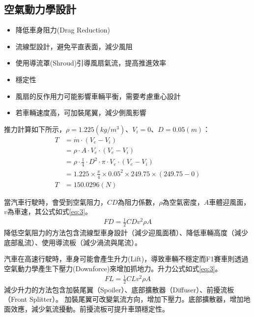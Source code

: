 \documentclass[12pt]{article}       %
\begin{document}
\subsection{空氣動力學設計} 
\begin{itemize}
    \item 降低車身阻力(Drag Reduction)
    \item 流線型設計，避免平直表面，減少風阻
    \item 使用導流罩(Shroud)引導風扇氣流，提高推進效率
    \item 穩定性
    \item 風扇的反作用力可能影響車輛平衡，需要考慮重心設計
    \item 若車輛速度高，可加裝尾翼，減少側風影響
\end{itemize}

推力計算如下所示，$\rho = 1.225(kg/m^3)$、$V_i =0$、$D=0.05(m)$：
\begin{align}
    T &= \dot{m} \cdot (V_e - V_i) \label{eq:thrust_formula} 
    \\
    &= \rho \cdot A \cdot V_e \cdot (V_e - V_i)   \nonumber
    \\
    &= \rho \cdot \frac{1}{4} \cdot D^2\cdot \pi \cdot V_e \cdot (V_e - V_i)   \nonumber
    \\
     &=1.225\times \frac{\pi}{4}\times 0.05^2 \times249.75\times(249.75-0) \nonumber
    \\
    T &= 150.0296(N)    \nonumber
\end{align}

當汽車行駛時，會受到空氣阻力，$CD$為阻力係數，$\rho$為空氣密度，$A$車體迎風面，$v$為車速，其公式如式\ref{eq:3}。
\begin{align}
    FD=\frac{1}{2}CDv^{2}\rho A  \label{eq:3}
\end{align}
降低空氣阻力的方法包含流線型車身設計（減少迎風面積）、降低車輛高度（減少底部亂流）、使用導流板（減少渦流與尾流）。

汽車在高速行駛時，車身可能會產生升力(Lift)，導致車輛不穩定而F1賽車則透過空氣動力學產生下壓力(Downforce)來增加抓地力。升力公式如式\ref{eq:3}。
\begin{align}
    FL=\frac{1}{2}CLv^{2}\rho A  \label{eq:4}
\end{align}
減少升力的方法包含加裝尾翼（Spoiler）、底部擴散器（Diffuser）、前擾流板（Front Splitter）。
加裝尾翼可改變氣流方向，增加下壓力。底部擴散器，增加地面效應，減少氣流擾動。前擾流板可提升車頭穩定性。
\end{document}
